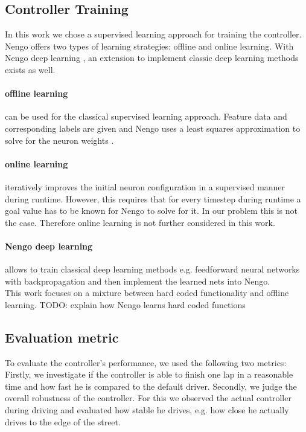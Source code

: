 \documentclass[10pt,a4paper,twoside,journal]{IEEEtran}
\begin{document}
\subsection{Controller Training}
In this work we chose a supervised learning approach for training the controller. Nengo offers two types of learning strategies: offline and online learning.
With Nengo deep learning \cite{nengo_dl}, an extension to implement classic deep learning methods exists as well.

\paragraph{offline learning} can be used for the classical supervised learning approach. Feature data and corresponding labels are given and Nengo uses a least squares approximation to solve for the neuron weights \cite{nef}.

\paragraph{online learning} iteratively improves the initial neuron configuration in a supervised manner during runtime. However, this requires that for every timestep during runtime a goal value has to be known for Nengo to solve for it. In our problem this is not the case. Therefore online learning is not further considered in this work.

\paragraph{Nengo deep learning} allows to train classical deep learning methods e.g. feedforward neural networks with backpropagation and then implement the learned nets into Nengo. \\
This work focuses on a mixture between hard coded functionality and offline learning.
TODO: explain how Nengo learns hard coded functions

\subsection{Evaluation metric}
To evaluate the controller's performance, we used the following two metrics: Firstly, we investigate if the controller is able to finish one lap in a reasonable time and how fast he is compared to the default driver. Secondly, we judge the overall robustness of the controller. For this we observed the actual controller during driving and evaluated how stable he drives, e.g. how close he actually drives to the edge of the street.
\end{document}
